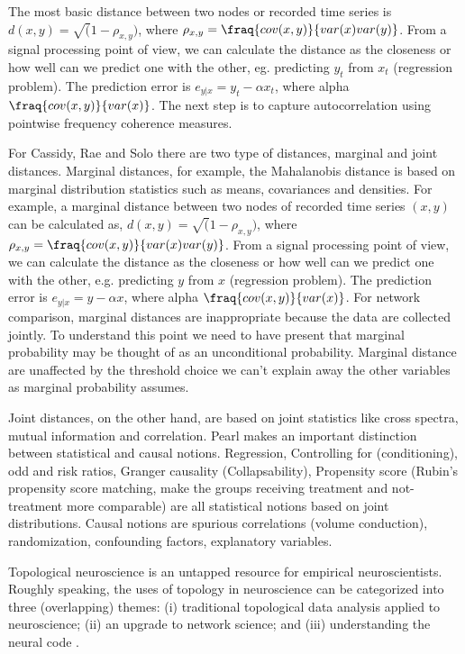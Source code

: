 \documentclass[onecollarge,runningheads]{svjour2}
\begin{document}
The most basic distance between two nodes or recorded time series is $d(x,y) = \sqrt(1 - \rho_{x,y})$, where $\rho_{x,y}=\fraq{cov(x,y)}{var(x)var(y)}$. From a signal processing point of view, we can calculate the distance as the closeness or how well can we predict one with the other, eg. predicting $y_t$ from $x_t$ (regression problem). The prediction error is $e_{y|x} = y_t - \alpha x_t$, where alpha $\fraq{cov(x,y)}{var(x)}$.
The next step is to capture autocorrelation using pointwise frequency coherence measures.

For Cassidy, Rae and Solo there are two type of distances, marginal and joint distances. Marginal distances, for example, the Mahalanobis distance is based on marginal distribution statistics such as means, covariances and densities. For example, a marginal distance between two nodes of recorded time series $(x,y)$ can be calculated as, $d(x,y) = \sqrt(1 - \rho_{x,y})$, where $\rho_{x,y}=\fraq{cov(x,y)}{var(x)var(y)}$. 
From a signal processing point of view, we can calculate the distance as the closeness or how well can we predict one with the other, e.g. predicting $y$ from $x$ (regression problem). The prediction error is $e_{y|x} = y- \alpha x$, where alpha $\fraq{cov(x,y)}{var(x)}$. For network comparison, marginal distances are inappropriate because the data are collected jointly. To understand this point we need to have present that marginal probability may be thought of as an unconditional probability. 
Marginal distance are unaffected by the threshold choice we can't explain away the other variables as marginal probability assumes.

Joint distances, on the other hand, are based on joint statistics like cross spectra, mutual information and correlation. Pearl makes an important distinction between statistical and causal notions. Regression, Controlling for (conditioning), odd and risk ratios, Granger causality (Collapsability), Propensity score (Rubin's propensity score matching, make the groups receiving treatment and not-treatment more comparable) are all statistical notions based on joint distributions. 
Causal notions are spurious correlations (volume conduction), randomization, confounding factors, explanatory variables.


Topological neuroscience is an untapped resource for empirical neuroscientists.
Roughly speaking, the uses of topology in neuroscience can be categorized into three (overlapping) themes: (i) traditional topological data analysis applied to neuroscience; (ii) an upgrade to network science; and (iii) understanding the neural code \citep{curto2016can}.
\end{document}
